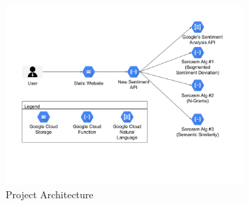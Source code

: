 \documentclass[conference]{IEEEtran}
\begin{document}
\begin{figure}[htbp]
\centerline{\includegraphics[width=9cm]{CS6221 Project Architecture Diagram-2.png}}
\caption{Project Architecture}
\label{fig6}
\end{figure}
\end{document}
